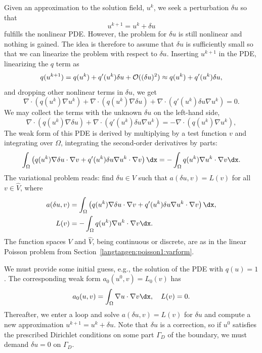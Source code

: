 Given an approximation to the solution field, $u^k$, we seek a
perturbation $\delta u$ so that
\begin{equation}
u^{k+1} = u^k + \delta u
\end{equation}
fulfills the nonlinear PDE.
However, the problem for $\delta u$ is still nonlinear and nothing is
gained. The idea is therefore to assume that $\delta u$ is sufficiently
small so that we can linearize the problem with respect to $\delta u$.
Inserting $u^{k+1}$ in the PDE,
linearizing the $q$ term as
\begin{equation}
q(u^{k+1}) = q(u^k) + q'(u^k)\delta u + {\cal O}((\delta u)^2)
\approx q(u^k) + q'(u^k)\delta u,
\end{equation}
and dropping other nonlinear terms in $\delta u$,
we get
\[
\nabla\cdot\left( q(u^k)\nabla u^k\right) +
\nabla\cdot\left( q(u^k)\nabla\delta u\right) +
\nabla\cdot\left( q'(u^k)\delta u\nabla u^k\right) = 0.
\]
We may collect the terms with the unknown $\delta u$ on the left-hand side,
\begin{equation}
\nabla\cdot\left( q(u^k)\nabla\delta u\right) +
\nabla\cdot\left( q'(u^k)\delta u\nabla u^k\right) =
-\nabla\cdot\left( q(u^k)\nabla u^k\right),
\end{equation}
The weak form of this PDE is derived by multiplying by a test function $v$
and integrating over $\Omega$, integrating the second-order derivatives
by parts:
\begin{equation}
\int_\Omega \left(
q(u^k)\nabla\delta u\cdot \nabla v
+ q'(u^k)\delta u\nabla u^k\cdot \nabla v\right)\dx
= -\int_\Omega q(u^k)\nabla u^k\cdot \nabla v\dx.
\end{equation}
The variational problem reads: find $\delta u\in V$ such that
$a(\delta u,v) = L(v)$ for all $v\in \hat V$, where
\begin{align}
a(\delta u,v) &= \int_\Omega \left( q(u^k)\nabla\delta u\cdot \nabla v
+ q'(u^k)\delta u\nabla u^k\cdot \nabla v\right)\dx,
\label{langtangen:nonlinear:poisson:pdelevel:eqa}
\\
L(v) &= - \int_\Omega q(u^k)\nabla u^k\cdot \nabla v\dx.
\label{langtangen:nonlinear:poisson:pdelevel:eqL}
\end{align}
The function spaces $V$ and $\hat V$, being continuous
or discrete, are as in the linear Poisson problem from
Section~\ref{langtangen:poisson1:varform}.

We must provide some initial guess, e.g., the solution of the
PDE with $q(u)=1$. The corresponding weak form $a_0(u^0,v)=L_0(v)$
has
\begin{equation}
a_0(u,v)=\int_\Omega\nabla u\cdot \nabla v\dx,\quad
L(v)=0.
\end{equation}
Thereafter, we enter a loop and solve $a(\delta u,v)=L(v)$ for $\delta
u$ and compute a new approximation $u^{k+1} = u^k + \delta u$. Note
that $\delta u$ is a correction, so if $u^0$ satisfies the prescribed
Dirichlet conditions on some part $\Gamma_D$ of the boundary, we must
demand $\delta u=0$ on $\Gamma_D$.

